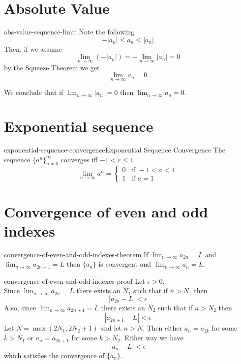 \documentclass[preview]{standalone}
\begin{document}
\section{Absolute Value}

\begin{snippet}{abs-value-sequence-limit}
Note the following
\[
    -|a_n| \leq a_n \leq |a_n|
\]
Then, if we assume
\[
    \lim_{n\to\infty} (-|a_n|) = - \lim_{n\to\infty} |a_n| =0 
\]
by the Squeeze Theorem we get
\[
    \lim_{n\to\infty} a_n =0
\]

We conclude that if \(\lim_{n\to\infty} |a_n|=0\) then
\(\lim_{n\to\infty} a_n=0\).
\end{snippet}

\section{Exponential sequence} %

\begin{snippettheorem}{exponential-sequence-convergence}{Exponential Sequence Convergence}
    The sequence \({\{a^n\}}_{n=0}^\infty\) converges iff \(-1<r\leq 1\)
    \[
        \lim_{n\to\infty} a^n = \begin{cases}
            0 & \text{if } -1 < a < 1 \\
            1 & \text{if } a=1
        \end{cases}
    \]
\end{snippettheorem}

\section{Convergence of even and odd indexes}

\begin{snippettheorem}{convergence-of-even-and-odd-indexes-theorem}{}
    If \(\lim_{n\to\infty}a_{2n}=L\) and \(\lim_{n\to\infty}a_{2n+1}=L\)
    then \(\{a_n\}\) is convergent and \(\lim_{n\to\infty}a_n=L\).
\end{snippettheorem}

\begin{snippetproof}{convergence-of-even-and-odd-indexes-proof}{}
    Let \(\epsilon>0\). \\
    Since \(\lim_{n\to\infty}a_{2n}=L\) there exists an \(N_1\) such that
    if \(n>N_1\) then
    \[
        |a_{2n}-L|<\epsilon
    \]
    Also, since \(\lim_{n\to\infty}a_{2n+1}=L\) there exists an \(N_2\) such that
    if \(n>N_2\) then
    \[
        |a_{2n+1}-L|<\epsilon
    \]
    Let \(N=\max(2N_1, 2N_2+1)\) and let \(n>N\).
    Then either \(a_n=a_{2k}\) for some \(k>N_1\) or \(a_n=a_{2k+1}\)
    for some \(k>N_2\). Either way we have
    \[
        |a_n-L|<\epsilon
    \]
    which satisfies the convergence of \(\{a_n\}\).
\end{snippetproof}
\end{document}
